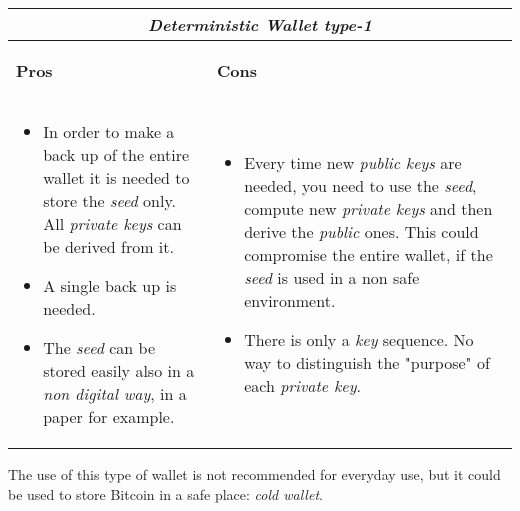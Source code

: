 \begin{center}
	\begin{tabular}{ |p{6cm}|p{6cm}|  }
		\hline
		\multicolumn{2}{|c|}{\textbf{\textit{Deterministic Wallet type-1}}} \\
		\hline \hline 
		\begin{center}
			\textbf{Pros}
		\end{center}&\begin{center}
			\textbf{Cons}
		\end{center}\\
		\hline
		\begin{itemize}
			\item In order to make a back up of the entire wallet it is needed to store the \textit{seed} only. All \textit{private keys} can be derived from it.
			\item A single back up is needed.
			\item The \textit{seed} can be stored easily also in a \textit{non digital way}, in a paper for example.
		\end{itemize} &
		\begin{itemize}
			\item Every time new \textit{public keys} are needed, you need to use the \textit{seed}, compute new \textit{private keys} and then derive the \textit{public} ones. This could compromise the entire wallet, if the \textit{seed} is used in a non safe environment.
			\item There is only a \textit{key} sequence. No way to distinguish the "purpose" of each \textit{private key}.
		\end{itemize}\\
		\hline
	\end{tabular}
\end{center}
The use of this type of wallet is not recommended for everyday use, but it could be used to store Bitcoin in a safe place: \textit{cold wallet}. 

